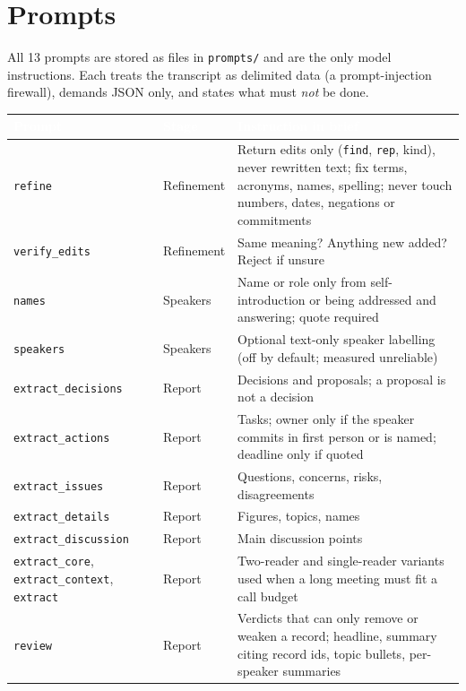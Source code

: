\documentclass[10pt,a4paper]{article}
\newcommand{\code}[1]{\texttt{\small #1}}
\newcommand{\HC}[1]{\textcolor{white}{\textbf{#1}}}
\begin{document}
\section{Prompts}
All 13 prompts are stored as files in \code{prompts/} and are the only model instructions. Each treats the transcript as delimited data (a prompt-injection firewall), demands JSON only, and states what must \emph{not} be done.
\begin{longtable}{@{}L{3.6cm}L{2.0cm}L{11.0cm}@{}}
\HC{Prompt}&\HC{Stage}&\HC{Instruction in brief}\\
\endhead
\code{refine} & Refinement & Return edits only (\code{find}, \code{rep}, kind), never rewritten text; fix terms, acronyms, names, spelling; never touch numbers, dates, negations or commitments\\
\code{verify\_edits} & Refinement & Same meaning? Anything new added? Reject if unsure\\
\code{names} & Speakers & Name or role only from self-introduction or being addressed and answering; quote required\\
\code{speakers} & Speakers & Optional text-only speaker labelling (off by default; measured unreliable)\\
\code{extract\_decisions} & Report & Decisions and proposals; a proposal is not a decision\\
\code{extract\_actions} & Report & Tasks; owner only if the speaker commits in first person or is named; deadline only if quoted\\
\code{extract\_issues} & Report & Questions, concerns, risks, disagreements\\
\code{extract\_details} & Report & Figures, topics, names\\
\code{extract\_discussion} & Report & Main discussion points\\
\code{extract\_core}, \code{extract\_context}, \code{extract} & Report & Two-reader and single-reader variants used when a long meeting must fit a call budget\\
\code{review} & Report & Verdicts that can only remove or weaken a record; headline, summary citing record ids, topic bullets, per-speaker summaries\\
\end{longtable}
\end{document}

